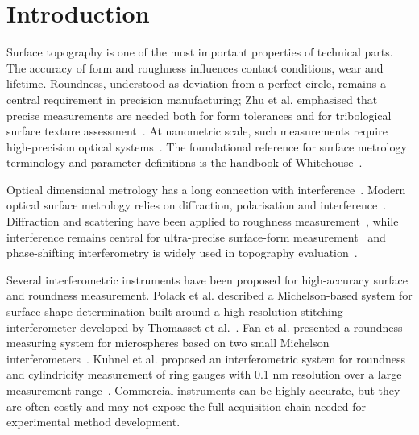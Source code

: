 \documentclass[review]{elsarticle}
\begin{document}
\linenumbers

\section{Introduction}
Surface topography is one of the most important properties of technical parts. The accuracy of form and roughness influences contact conditions, wear and lifetime. Roundness, understood as deviation from a perfect circle, remains a central requirement in precision manufacturing; Zhu et al. emphasised that precise measurements are needed both for form tolerances and for tribological surface texture assessment~\cite{Zhu2019}. At nanometric scale, such measurements require high-precision optical systems~\cite{Leach2011}. The foundational reference for surface metrology terminology and parameter definitions is the handbook of Whitehouse~\cite{Whitehouse2011}.

Optical dimensional metrology has a long connection with interference~\cite{MICHELSON1893}. Modern optical surface metrology relies on diffraction, polarisation and interference~\cite{Jenkins1976,Born2000}. Diffraction and scattering have been applied to roughness measurement~\cite{Brodmann1983,Brodmann1986,Fan1994,Hertzsch2002,Kucharski_D._A_2020}, while interference remains central for ultra-precise surface-form measurement~\cite{Benoit1898,Xue-fei2015} and phase-shifting interferometry is widely used in topography evaluation~\cite{DeGroot2011a,Chatterjee:2015phase,deGroot2014}.

Several interferometric instruments have been proposed for high-accuracy surface and roundness measurement. Polack et al. described a Michelson-based system for surface-shape determination built around a high-resolution stitching interferometer developed by Thomasset et al.~\cite{Polack2019,Thomasset2013}. Fan et al. presented a roundness measuring system for microspheres based on two small Michelson interferometers~\cite{Fan2014}. Kuhnel et al. proposed an interferometric system for roundness and cylindricity measurement of ring gauges with 0.1 nm resolution over a large measurement range~\cite{Kuhnel2012}. Commercial instruments can be highly accurate, but they are often costly and may not expose the full acquisition chain needed for experimental method development. 
\end{document}
